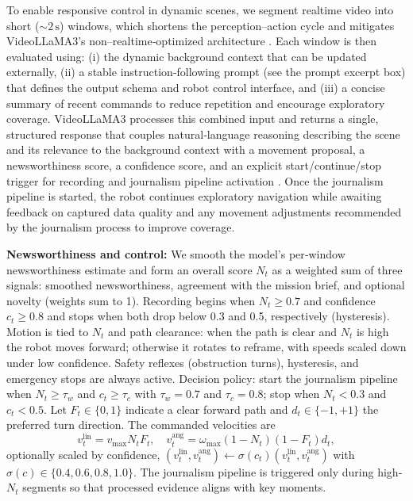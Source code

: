 \documentclass[letterpaper, 10 pt, conference]{ieeeconf}  %
\begin{document}
To enable responsive control in dynamic scenes, we segment real\-time video into short (\(\sim\!2\,\text{s}\)) windows, which shortens the perception–action cycle and mitigates VideoLLaMA3's non–real\-time‑optimized architecture \cite{videollama3_2025}. Each window is then evaluated using: (i) the dynamic background context that can be updated externally, (ii) a stable instruction‑following prompt (see the prompt excerpt box) that defines the output schema and robot control interface, and (iii) a concise summary of recent commands to reduce repetition and encourage exploratory coverage. VideoLLaMA3 \cite{videollama3_2025} processes this combined input and returns a single, structured response that couples natural‑language reasoning describing the scene and its relevance to the background context with a movement proposal, a newsworthi\-ness score, a confidence score, and an explicit start/continue/stop trigger for recording and journalism pipeline activation \cite{videollama3_2025}. Once the journalism pipeline is started, the robot continues exploratory navigation while awaiting feedback on captured data quality and any movement adjustments recommended by the journalism process to improve coverage.


\textbf{Newsworthiness and control:} We smooth the model's per‑window newsworthi\-ness estimate and form an overall score $N_t$ as a weighted sum of three signals: smoothed newsworthi\-ness, agreement with the mission brief, and optional novelty (weights sum to 1). Recording begins when $N_t \ge 0.7$ and confidence $c_t \ge 0.8$ and stops when both drop below 0.3 and 0.5, respectively (hysteresis). Motion is tied to $N_t$ and path clearance: when the path is clear and $N_t$ is high the robot moves forward; otherwise it rotates to reframe, with speeds scaled down under low confidence. Safety reflexes (obstruction turns), hysteresis, and emergency stops are always active. Decision policy: start the journalism pipeline when $N_t \ge \tau_w$ and $c_t \ge \tau_c$ with $\tau_w{=}0.7$ and $\tau_c{=}0.8$; stop when $N_t{<}0.3$ and $c_t{<}0.5$. Let $F_t\in\{0,1\}$ indicate a clear forward path and $d_t\in\{-1,+1\}$ the preferred turn direction. The commanded velocities are
\[ v^{\text{lin}}_t = v_{\max} N_t F_t,\quad v^{\text{ang}}_t = \omega_{\max} (1{-}N_t) (1{-}F_t) d_t, \]
optionally scaled by confidence, $ (v^{\text{lin}}_t, v^{\text{ang}}_t) \leftarrow \sigma(c_t) (v^{\text{lin}}_t, v^{\text{ang}}_t)$ with $\sigma(c)\in\{0.4,0.6,0.8,1.0\}$. The journalism pipeline is triggered only during high‑$N_t$ segments so that processed evidence aligns with key moments.
\end{document}
